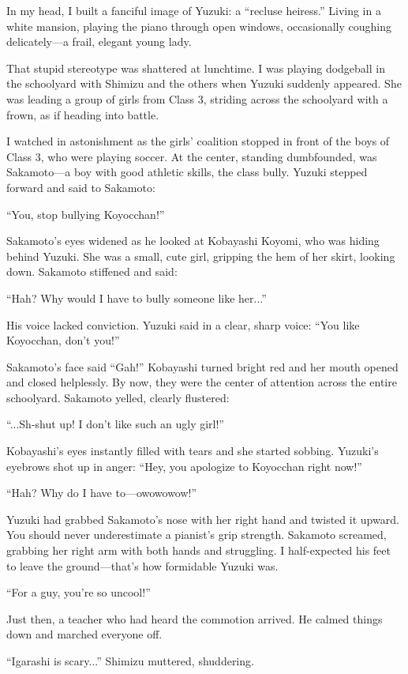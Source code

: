 \documentclass[
    a4paper,
    12pt,
    twoside,
    openany,
    UTF8,
    fontset=windows
]{ctexbook}
\begin{document}
In my head, I built a fanciful image of Yuzuki: a ``recluse heiress.'' Living in a white mansion, playing the piano through open windows, occasionally coughing delicately---a frail, elegant young lady.

That stupid stereotype was shattered at lunchtime. I was playing dodgeball in the schoolyard with Shimizu and the others when Yuzuki suddenly appeared. She was leading a group of girls from Class 3, striding across the schoolyard with a frown, as if heading into battle.

I watched in astonishment as the girls' coalition stopped in front of the boys of Class 3, who were playing soccer. At the center, standing dumbfounded, was Sakamoto---a boy with good athletic skills, the class bully. Yuzuki stepped forward and said to Sakamoto:

``You, stop bullying Koyocchan!''

Sakamoto's eyes widened as he looked at Kobayashi Koyomi, who was hiding behind Yuzuki. She was a small, cute girl, gripping the hem of her skirt, looking down. Sakamoto stiffened and said:

``Hah? Why would I have to bully someone like her...''

His voice lacked conviction. Yuzuki said in a clear, sharp voice: ``You like Koyocchan, don't you!''

Sakamoto's face said ``Gah!'' Kobayashi turned bright red and her mouth opened and closed helplessly. By now, they were the center of attention across the entire schoolyard. Sakamoto yelled, clearly flustered:

``...Sh-shut up! I don't like such an ugly girl!''

Kobayashi's eyes instantly filled with tears and she started sobbing. Yuzuki's eyebrows shot up in anger: ``Hey, you apologize to Koyocchan right now!''

``Hah? Why do I have to---owowowow!''

Yuzuki had grabbed Sakamoto's nose with her right hand and twisted it upward. You should never underestimate a pianist's grip strength. Sakamoto screamed, grabbing her right arm with both hands and struggling. I half-expected his feet to leave the ground---that's how formidable Yuzuki was.

``For a guy, you're so uncool!''

Just then, a teacher who had heard the commotion arrived. He calmed things down and marched everyone off.

``Igarashi is scary...'' Shimizu muttered, shuddering.
\end{document}
